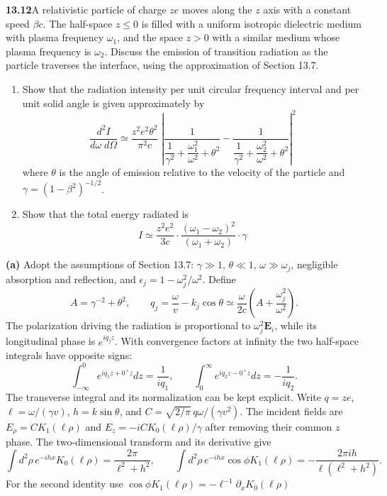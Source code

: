 \par\bigskip
\noindent\textbf{13.12}\quad A relativistic particle of charge $ze$ moves along the $z$ axis with a constant speed $\beta c$. The half-space $z\leq0$ is filled with a uniform isotropic dielectric medium with plasma frequency $\omega_{1}$, and the space $z>0$ with a similar medium whose plasma frequency is $\omega_{2}$. Discuss the emission of transition radiation as the particle traverses the interface, using the approximation of Section 13.7.
\begin{enumerate}
\item[(a)] Show that the radiation intensity per unit circular frequency interval and per unit solid angle is given approximately by
\[
\frac{d^{2}I}{d\omega\;d\Omega}\simeq\frac{z^{2}e^{2}\theta^{2}}{\pi^{2}c}\;
\left|\frac{1}{\dfrac{1}{\gamma^{2}}+\dfrac{\omega_{1}^{2}}{\omega^{2}}+\theta^{2}}
-\frac{1}{\dfrac{1}{\gamma^{2}}+\dfrac{\omega_{2}^{2}}{\omega^{2}}+\theta^{2}}\right|^{2}
\]
where $\theta$ is the angle of emission relative to the velocity of the particle and $\gamma=(1-\beta^{2})^{-1/2}$.
\item[(b)] Show that the total energy radiated is
\[
I\simeq\frac{z^{2}e^{2}}{3c}\cdot\frac{(\omega_{1}-\omega_{2})^{2}}{(\omega_{1}+\omega_{2})}\cdot\gamma
\]
\end{enumerate}
\solution
\textbf{(a)} Adopt the assumptions of Section 13.7:
$\gamma\gg1$, $\theta\ll1$, $\omega\gg\omega_j$, negligible absorption
and reflection, and
$\epsilon_j=1-\omega_j^2/\omega^2$. Define
\[
 A=\gamma^{-2}+\theta^2,\qquad
 q_j=\frac{\omega}{v}-k_j\cos\theta
 \simeq\frac{\omega}{2c}
       \left(A+\frac{\omega_j^2}{\omega^2}\right).
\]
The polarization driving the radiation is proportional to
$\omega_j^2\mathbf E_i$, while its longitudinal phase is $e^{iq_jz}$.
With convergence factors at infinity the two half-space integrals have
opposite signs:
\[
 \int_{-\infty}^0e^{iq_1z+0^+z}dz=\frac1{iq_1},
 \qquad
 \int_0^\infty e^{iq_2z-0^+z}dz=-\frac1{iq_2}.
\]
The transverse integral and its normalization can be kept explicit.
Write $q=ze$, $\ell=\omega/(\gamma v)$, $h=k\sin\theta$, and
$C=\sqrt{2/\pi}\,q\omega/(\gamma v^2)$. The incident fields are
$E_\rho=CK_1(\ell\rho)$ and $E_z=-iCK_0(\ell\rho)/\gamma$
after removing their common $z$ phase. The two-dimensional transform
and its derivative give
\[
\int d^2\rho\,e^{-ihx}K_0(\ell\rho)=\frac{2\pi}{\ell^2+h^2},
\qquad
\int d^2\rho\,e^{-ihx}\cos\phi K_1(\ell\rho)
=-\frac{2\pi i h}{\ell(\ell^2+h^2)}.
\]
For the second identity use
$\cos\phi K_1(\ell\rho)=-\ell^{-1}\partial_xK_0(\ell\rho)$
